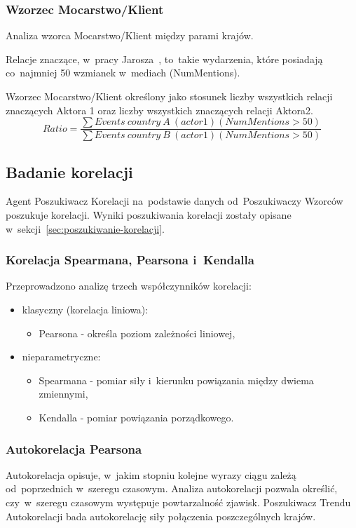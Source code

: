 \documentclass[11pt]{report}
\begin{document}
    \subsubsection{Wzorzec Mocarstwo/Klient}
    Analiza wzorca Mocarstwo/Klient między parami krajów.

    Relacje znaczące, w~pracy Jarosza~\cite{Jarosz2020}, to~takie wydarzenia, które posiadają co~najmniej 50 wzmianek w~mediach (NumMentions).\@ %

    Wzorzec Mocarstwo/Klient określony jako stosunek liczby wszystkich relacji znaczących Aktora 1 oraz liczby wszystkich znaczących relacji Aktora2. %
    \[ Ratio = \frac
    {\sum{Events\ country\ A\ (actor 1) (NumMentions > 50)}}
    {\sum{Events\ country\ B\ (actor 1) (NumMentions > 50)}}
    \]

    \subsection{Badanie korelacji}
    Agent Poszukiwacz Korelacji na~podstawie danych od~Poszukiwaczy Wzorców poszukuje korelacji.
    Wyniki poszukiwania korelacji zostały opisane w~sekcji~\ref{sec:poszukiwanie-korelacji}.

    \subsubsection{Korelacja Spearmana, Pearsona i~Kendalla}

    Przeprowadzono analizę trzech współczynników korelacji:
    \begin{itemize}
        \item klasyczny (korelacja liniowa):
        \begin{itemize}
            \item Pearsona - określa poziom zależności liniowej,
        \end{itemize}
        \item nieparametryczne:
        \begin{itemize}
            \item Spearmana - pomiar siły i~kierunku powiązania między dwiema zmiennymi,
            \item Kendalla - pomiar powiązania porządkowego.
        \end{itemize}
    \end{itemize}

    \subsubsection{Autokorelacja Pearsona}
    Autokorelacja opisuje, w~jakim stopniu kolejne wyrazy ciągu zależą od~poprzednich w~szeregu czasowym.
    Analiza autokorelacji pozwala określić, czy~w~szeregu czasowym występuje powtarzalność zjawisk.
    Poszukiwacz Trendu Autokorelacji bada autokorelację siły połączenia poszczególnych krajów.
\end{document}
